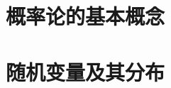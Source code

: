 \documentclass{article}
\begin{document}
  \tableofcontents
  \newpage

  \section{概率论的基本概念}
    
  \section{随机变量及其分布}
    
\end{document}
